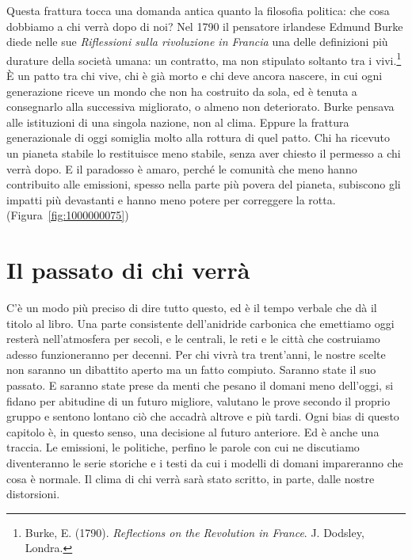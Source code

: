 Questa frattura tocca una domanda antica quanto la filosofia politica: che cosa dobbiamo a chi verr\`{a} dopo di noi? Nel 1790 il pensatore irlandese Edmund Burke diede nelle sue \textit{Riflessioni sulla rivoluzione in Francia} una delle definizioni pi\`{u} durature della societ\`{a} umana: un contratto, ma non stipulato soltanto tra i vivi.\footnote{Burke, E. (1790). \textit{Reflections on the Revolution in France}. J. Dodsley, Londra.} \`{E} un patto tra chi vive, chi \`{e} gi\`{a} morto e chi deve ancora nascere, in cui ogni generazione riceve un mondo che non ha costruito da sola, ed \`{e} tenuta a consegnarlo alla successiva migliorato, o almeno non deteriorato. Burke pensava alle istituzioni di una singola nazione, non al clima. Eppure la frattura generazionale di oggi somiglia molto alla rottura di quel patto. Chi ha ricevuto un pianeta stabile lo restituisce meno stabile, senza aver chiesto il permesso a chi verr\`{a} dopo. E il paradosso \`{e} amaro, perch\'{e} le comunit\`{a} che meno hanno contribuito alle emissioni, spesso nella parte pi\`{u} povera del pianeta, subiscono gli impatti pi\`{u} devastanti e hanno meno potere per correggere la rotta. (Figura~\ref{fig:1000000075})

\section{Il passato di chi verr\`{a}}

C'\`{e} un modo pi\`{u} preciso di dire tutto questo, ed \`{e} il tempo verbale che d\`{a} il titolo al libro. Una parte consistente dell'anidride carbonica che emettiamo oggi rester\`{a} nell'atmosfera per secoli, e le centrali, le reti e le citt\`{a} che costruiamo adesso funzioneranno per decenni. Per chi vivr\`{a} tra trent'anni, le nostre scelte non saranno un dibattito aperto ma un fatto compiuto. Saranno state il suo passato. E saranno state prese da menti che pesano il domani meno dell'oggi, si fidano per abitudine di un futuro migliore, valutano le prove secondo il proprio gruppo e sentono lontano ci\`{o} che accadr\`{a} altrove e pi\`{u} tardi. Ogni bias di questo capitolo \`{e}, in questo senso, una decisione al futuro anteriore. Ed \`{e} anche una traccia. Le emissioni, le politiche, perfino le parole con cui ne discutiamo diventeranno le serie storiche e i testi da cui i modelli di domani impareranno che cosa \`{e} normale. Il clima di chi verr\`{a} sar\`{a} stato scritto, in parte, dalle nostre distorsioni.


